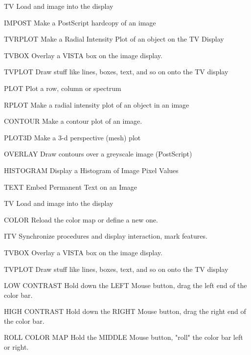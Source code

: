 {\newpage\clearpage
{}%
\begin{example} 
  \item[TV\hfill]{Load and image into the display}
  \item[IMPOST\hfill]{Make a PostScript hardcopy of an image}
  \item[TVRPLOT\hfill]{Make a Radial Intensity Plot of an object on the 
       TV Display}
  \item[TVBOX\hfill]{Overlay a VISTA box on the image display.}
  \item[TVPLOT \hfill]{Draw stuff like lines, boxes, text, and so on onto the 
       TV display}
  \item[PLOT\hfill]{Plot a row, column or spectrum}
  \item[RPLOT\hfill]{Make a radial intensity plot of an object in an image}
  \item[CONTOUR\hfill]{Make a contour plot of an image.}
  \item[PLOT3D\hfill]{Make a 3-d perspective (mesh) plot}
  \item[OVERLAY\hfill]{Draw contours over a greyscale image (PostScript)}
  \item[HISTOGRAM\hfill]{Display a Histogram of Image Pixel Values}
  \item[TEXT\hfill]{Embed Permanent Text on an Image}
\end{example}%
\lthtmlfigureZ
\lthtmlcheckvsize\clearpage}

{\newpage\clearpage
{}%
\begin{example} 
  \item[TV\hfill]{Load and image into the display}
  \item[COLOR\hfill]{Reload the color map or define a new one.}
  \item[ITV\hfill]{Synchronize procedures and display interaction, mark
       features.}
  \item[TVBOX\hfill]{Overlay a VISTA box on the image display.}
  \item[TVPLOT \hfill]{Draw stuff like lines, boxes, text, and so on onto the 
       TV display}
\end{example}%
\lthtmlfigureZ
\lthtmlcheckvsize\clearpage}

{\newpage\clearpage
{}%
\begin{example}
  \item[LOW CONTRAST]{Hold down the LEFT Mouse button, drag the left
       end of the color bar.}
\par
\item[HIGH CONTRAST]{Hold down the RIGHT Mouse button, drag the right
       end of the color bar.}
\par
\item[ROLL COLOR MAP]{Hold the MIDDLE Mouse button, "roll" the
       color bar left or right.}
\end{example}%
\lthtmlfigureZ
\lthtmlcheckvsize\clearpage}

